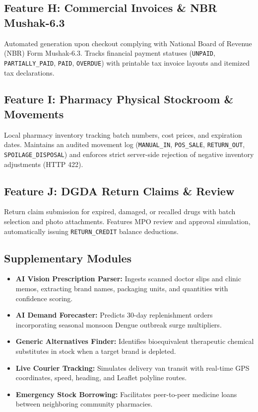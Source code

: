 \documentclass[10pt,a4paper]{article}
\begin{document}
\subsection{Feature H: Commercial Invoices \& NBR Mushak-6.3}
Automated generation upon checkout complying with National Board of Revenue (NBR) Form Mushak-6.3. Tracks financial payment statuses (\texttt{UNPAID}, \texttt{PARTIALLY\_PAID}, \texttt{PAID}, \texttt{OVERDUE}) with printable tax invoice layouts and itemized tax declarations.

\subsection{Feature I: Pharmacy Physical Stockroom \& Movements}
Local pharmacy inventory tracking batch numbers, cost prices, and expiration dates. Maintains an audited movement log (\texttt{MANUAL\_IN}, \texttt{POS\_SALE}, \texttt{RETURN\_OUT}, \texttt{SPOILAGE\_DISPOSAL}) and enforces strict server-side rejection of negative inventory adjustments (HTTP 422).

\subsection{Feature J: DGDA Return Claims \& Review}
Return claim submission for expired, damaged, or recalled drugs with batch selection and photo attachments. Features MPO review and approval simulation, automatically issuing \texttt{RETURN\_CREDIT} balance deductions.

\subsection{Supplementary Modules}
\begin{itemize}[leftmargin=*]
    \item \textbf{AI Vision Prescription Parser:} Ingests scanned doctor slips and clinic memos, extracting brand names, packaging units, and quantities with confidence scoring.
    \item \textbf{AI Demand Forecaster:} Predicts 30-day replenishment orders incorporating seasonal monsoon Dengue outbreak surge multipliers.
    \item \textbf{Generic Alternatives Finder:} Identifies bioequivalent therapeutic chemical substitutes in stock when a target brand is depleted.
    \item \textbf{Live Courier Tracking:} Simulates delivery van transit with real-time GPS coordinates, speed, heading, and Leaflet polyline routes.
    \item \textbf{Emergency Stock Borrowing:} Facilitates peer-to-peer medicine loans between neighboring community pharmacies.
\end{itemize}
\end{document}
